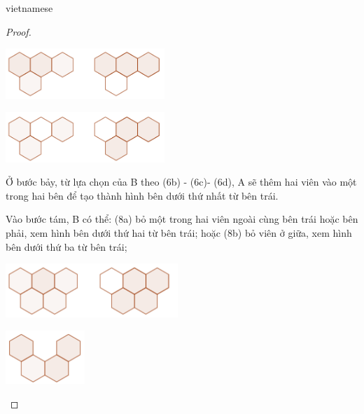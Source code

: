 \documentclass{article}
\begin{document}
\begin{otherlanguage*}{vietnamese}
\begin{proof}
    \begin{center}
        \begin{minipage}[t]{6.5cm}
            \begin{center}
                \includegraphics[width=6cm]{./svg/pdf/pi-2024-1-p3-5-6a.pdf}
            \end{center}
        \end{minipage}
        \qquad
        \begin{minipage}[t]{6.5cm}
            \centering
            \begin{center}
                \includegraphics[width=6cm]{./svg/pdf/pi-2024-1-p3-6b-6c.pdf}
            \end{center}
        \end{minipage}
    \end{center}
   
    Ở bước bảy, từ lựa chọn của B theo (6b) - (6c)- (6d), A sẽ thêm hai viên vào một trong hai bên để tạo thành hình bên dưới thứ nhất từ bên trái.
    
    Vào bước tám, B có thể: (8a) bỏ một trong hai viên ngoài cùng bên trái hoặc bên phải, xem hình bên dưới thứ hai từ bên trái;
    hoặc (8b) bỏ viên ở giữa, xem hình bên dưới thứ ba từ bên trái;
    
    \begin{center}
        \centering
        \begin{minipage}[t]{6.5cm}
            \begin{center}
                \includegraphics[width=6.5cm]{./svg/pdf/pi-2024-1-p3-7-8a.pdf}
            \end{center}
        \end{minipage}
        \qquad
        \begin{minipage}[t]{3cm}
            \raggedleft
            \begin{center}
                \includegraphics[width=3cm]{./svg/pdf/pi-2024-1-p3-8b.pdf}
            \end{center}
        \end{minipage}
    \end{center}


\end{proof}
\end{otherlanguage*}
\end{document}
